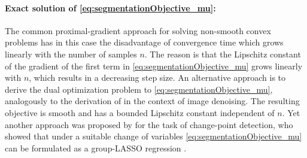 \paragraph{Exact solution of \eqref{eq:segmentationObjective_mu}:}
The common proximal-gradient approach \cite{bach2011convex,Beck_FISTA:2009} for solving non-smooth convex problems has in this case the disadvantage of convergence time which grows linearly with the number of samples $n$. The reason is that the Lipschitz constant of the gradient of the first term in \eqref{eq:segmentationObjective_mu} grows linearly with $n$, which results in a decreasing step size. An alternative approach is to derive the dual optimization problem to \eqref{eq:segmentationObjective_mu}, analogously to the derivation of \cite{Beck_TV:2009} %
in the context of image denoising. The resulting objective is smooth and has a bounded Lipschitz constant independent of $n$.
Yet another approach was proposed by \cite{bleakley2011group} for the task of change-point detection, who showed that under a suitable change of variables \eqref{eq:segmentationObjective_mu} can be formulated as a group-LASSO regression \cite{tibshirani1996regression,yuan2006model}.
